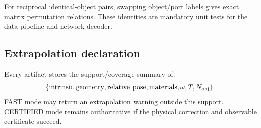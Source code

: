 For reciprocal identical-object pairs, swapping object/port labels gives exact
matrix permutation relations. These identities are mandatory unit tests for
the data pipeline and network decoder.

\subsection{Extrapolation declaration}

Every artifact stores the support/coverage summary of:
\[
  \{\text{intrinsic geometry},
    \text{relative pose},
    \text{materials},
    \omega,
    T,
    N_{\rm obj}\}.
\]
FAST mode may return an extrapolation warning outside this support.
CERTIFIED mode remains authoritative if the physical correction and observable
certificate succeed.
